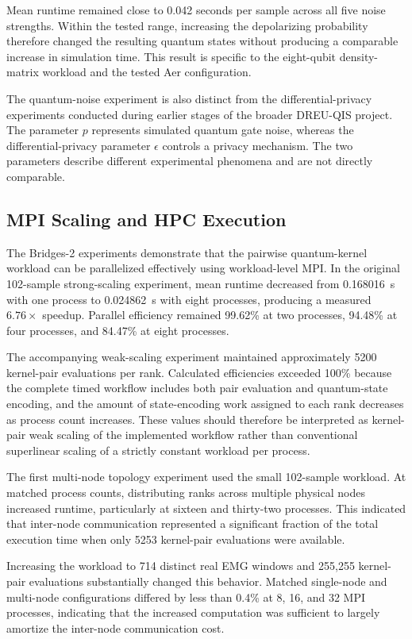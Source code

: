 \documentclass[pdflatex,sn-mathphys-num]{sn-jnl}%
\theoremstyle{thmstyleone}%
\theoremstyle{thmstyletwo}%
\theoremstyle{thmstylethree}%
\begin{document}
Mean runtime remained close to 0.042 seconds per sample across all five noise
strengths. Within the tested range, increasing the depolarizing probability
therefore changed the resulting quantum states without producing a comparable
increase in simulation time. This result is specific to the eight-qubit
density-matrix workload and the tested Aer configuration.

The quantum-noise experiment is also distinct from the differential-privacy
experiments conducted during earlier stages of the broader DREU-QIS project.
The parameter $p$ represents simulated quantum gate noise, whereas the
differential-privacy parameter $\epsilon$ controls a privacy mechanism. The two
parameters describe different experimental phenomena and are not directly
comparable.


\subsection{MPI Scaling and HPC Execution}
\label{subsec:mpi-discussion}

The Bridges-2 experiments demonstrate that the pairwise quantum-kernel
workload can be parallelized effectively using workload-level MPI. In the
original 102-sample strong-scaling experiment, mean runtime decreased from
0.168016~s with one process to 0.024862~s with eight processes, producing a
measured \(6.76\times\) speedup. Parallel efficiency remained 99.62\% at two
processes, 94.48\% at four processes, and 84.47\% at eight processes.

The accompanying weak-scaling experiment maintained approximately 5200
kernel-pair evaluations per rank. Calculated efficiencies exceeded 100\%
because the complete timed workflow includes both pair evaluation and
quantum-state encoding, and the amount of state-encoding work assigned to each
rank decreases as process count increases. These values should therefore be
interpreted as kernel-pair weak scaling of the implemented workflow rather
than conventional superlinear scaling of a strictly constant workload per
process.

The first multi-node topology experiment used the small 102-sample workload.
At matched process counts, distributing ranks across multiple physical nodes
increased runtime, particularly at sixteen and thirty-two processes. This
indicated that inter-node communication represented a significant fraction of
the total execution time when only 5253 kernel-pair evaluations were available.

Increasing the workload to 714 distinct real EMG windows and 255,255
kernel-pair evaluations substantially changed this behavior. Matched
single-node and multi-node configurations differed by less than 0.4\% at
8, 16, and 32 MPI processes, indicating that the increased computation was
sufficient to largely amortize the inter-node communication cost.
\end{document}
